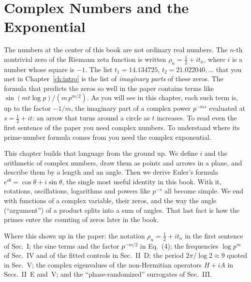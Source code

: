 \chapter{Complex Numbers and the Exponential}\label{ch:complex}

\begin{chapterintro}
The numbers at the center of this book are not ordinary real numbers. The $n$-th nontrivial zero of the Riemann zeta function is written $\rho_n=\tfrac12+i t_n$, where $i$ is a number whose square is $-1$. The list $t_1=14.134725$, $t_2=21.022040,\dots$ that you met in Chapter~\ref{ch:intro} is the list of \emph{imaginary parts} of these zeros. The formula that predicts the zeros so well in the paper contains terms like $\sin(mt\log p)/(m\,p^{m/2})$. As you will see in this chapter, each such term is, up to the factor $-1/m$, the imaginary part of a complex power $p^{-ms}$ evaluated at $s=\tfrac12+it$: an arrow that turns around a circle as $t$ increases. To read even the first sentence of the paper you need complex numbers. To understand where its prime-number formula comes from you need the complex exponential.

This chapter builds that language from the ground up. We define $i$ and the arithmetic of complex numbers, draw them as points and arrows in a plane, and describe them by a length and an angle. Then we derive Euler's formula $e^{i\theta}=\cos\theta+i\sin\theta$, the single most useful identity in this book. With it, rotations, oscillations, logarithms and powers like $p^{-s}$ all become simple. We end with functions of a complex variable, their zeros, and the way the angle (``argument'') of a product splits into a sum of angles. That last fact is how the primes enter the counting of zeros later in the book.

Where this shows up in the paper: the notation $\rho_n=\tfrac12+it_n$ in the first sentence of Sec.~I; the sine terms and the factor $p^{-m/2}$ in Eq.~(4); the frequencies $\log p^m$ of Sec.~IV and of the fitted controls in Sec.~II~D; the period $2\pi/\log 2\approx 9$ quoted in Sec.~V; the complex eigenvalues of the non-Hermitian operators $H+iA$ in Secs.~II~E and~V; and the ``phase-randomized'' surrogates of Sec.~III.
\end{chapterintro}

